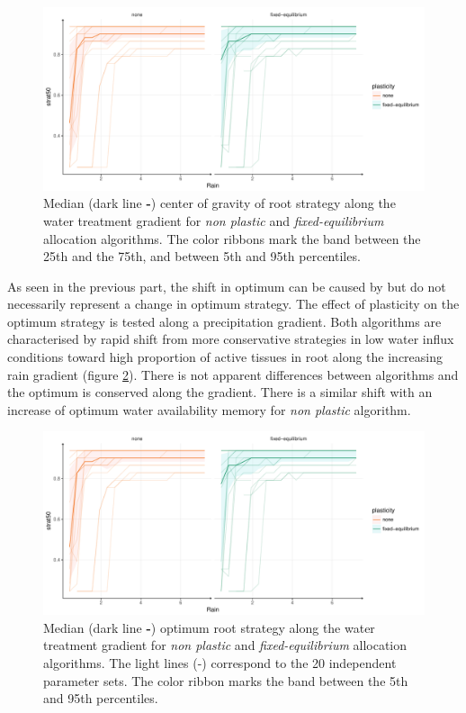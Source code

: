 \begin{figure}\label{fig:gradient_optimum_strat}
\includegraphics[width = \textwidth]{./2_PP/Figures/Rain/best_strat_pl_rain_grad_alt.pdf}
\caption{Median (dark line \textbf{-}) center of gravity of root strategy along the water treatment gradient for \textcolor{myOrange}{\textit{non plastic}} and \textcolor{myGreen}{\textit{fixed-equilibrium}} allocation algorithms. The color ribbons mark the band between the 25th and the 75th, and between 5th and 95th percentiles.} %
\end{figure}

As seen in the previous part, the shift in optimum can be caused by  but do not necessarily represent a change in optimum strategy. The effect of plasticity on the optimum strategy is tested along a precipitation gradient. Both algorithms are characterised by rapid shift from more conservative strategies in low water influx conditions toward high proportion of active tissues in root along the increasing rain gradient (figure \ref{fig:gradient_optimum_strat}).  There is not apparent differences between algorithms and the optimum is conserved along the gradient. There is a similar shift with an increase of optimum water availability memory for \textit{non plastic} algorithm.


\begin{figure}\label{fig:gradient_optimum_strat}
\includegraphics[width = \textwidth]{./2_PP/Figures/Rain/best_strat_pl_rain_grad_alt.pdf}
\caption{Median (dark line \textbf{-}) optimum root strategy along the water treatment gradient for \textit{non plastic} and \textit{fixed-equilibrium} allocation algorithms. The light lines (-) correspond to the 20 independent parameter sets. The color ribbon marks the band between the 5th and 95th percentiles.} %
\end{figure}


